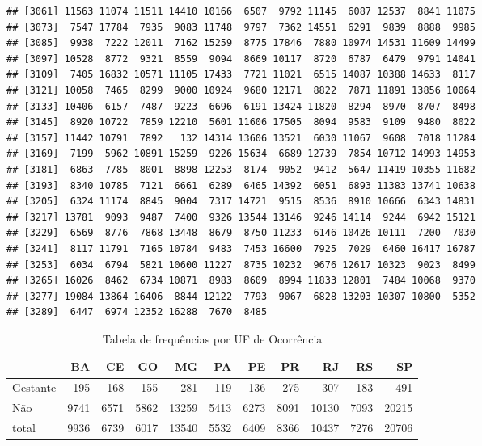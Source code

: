 \documentclass[
]{article}
\begin{document}
\begin{verbatim}
## [3061] 11563 11074 11511 14410 10166  6507  9792 11145  6087 12537  8841 11075
## [3073]  7547 17784  7935  9083 11748  9797  7362 14551  6291  9839  8888  9985
## [3085]  9938  7222 12011  7162 15259  8775 17846  7880 10974 14531 11609 14499
## [3097] 10528  8772  9321  8559  9094  8669 10117  8720  6787  6479  9791 14041
## [3109]  7405 16832 10571 11105 17433  7721 11021  6515 14087 10388 14633  8117
## [3121] 10058  7465  8299  9000 10924  9680 12171  8822  7871 11891 13856 10064
## [3133] 10406  6157  7487  9223  6696  6191 13424 11820  8294  8970  8707  8498
## [3145]  8920 10722  7859 12210  5601 11606 17505  8094  9583  9109  9480  8022
## [3157] 11442 10791  7892   132 14314 13606 13521  6030 11067  9608  7018 11284
## [3169]  7199  5962 10891 15259  9226 15634  6689 12739  7854 10712 14993 14953
## [3181]  6863  7785  8001  8898 12253  8174  9052  9412  5647 11419 10355 11682
## [3193]  8340 10785  7121  6661  6289  6465 14392  6051  6893 11383 13741 10638
## [3205]  6324 11174  8845  9004  7317 14721  9515  8536  8910 10666  6343 14831
## [3217] 13781  9093  9487  7400  9326 13544 13146  9246 14114  9244  6942 15121
## [3229]  6569  8776  7868 13448  8679  8750 11233  6146 10426 10111  7200  7030
## [3241]  8117 11791  7165 10784  9483  7453 16600  7925  7029  6460 16417 16787
## [3253]  6034  6794  5821 10600 11227  8735 10232  9676 12617 10323  9023  8499
## [3265] 16026  8462  6734 10871  8983  8609  8994 11833 12801  7484 10068  9370
## [3277] 19084 13864 16406  8844 12122  7793  9067  6828 13203 10307 10800  5352
## [3289]  6447  6974 12352 16288  7670  8485
\end{verbatim}

\begin{table}

\caption{\label{tab:unnamed-chunk-13}Tabela de frequências por  UF de Ocorrência}
\centering
\begin{tabular}[t]{l|r|r|r|r|r|r|r|r|r|r}
\hline
  & BA & CE & GO & MG & PA & PE & PR & RJ & RS & SP\\
\hline
Gestante & 195 & 168 & 155 & 281 & 119 & 136 & 275 & 307 & 183 & 491\\
\hline
Não & 9741 & 6571 & 5862 & 13259 & 5413 & 6273 & 8091 & 10130 & 7093 & 20215\\
\hline
total & 9936 & 6739 & 6017 & 13540 & 5532 & 6409 & 8366 & 10437 & 7276 & 20706\\
\hline
\end{tabular}
\end{table}
\end{document}
